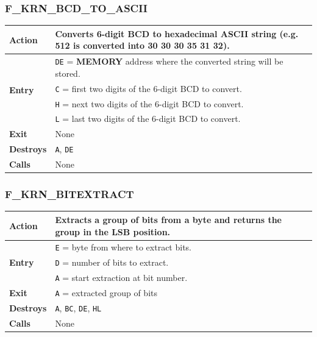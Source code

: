 \documentclass[a4paper,11pt]{article}
\begin{document}
        \subsubsection{F\_KRN\_BCD\_TO\_ASCII}
        \label{func:fkrnbcdtoascii}
        \begin{tabular}{l p{9cm}}
            \hline\textbf{Action}
            & Converts 6-digit BCD to hexadecimal ASCII string
            (e.g. 512 is converted into 30 30 30 35 31 32).\\
            \hline\multirow[t]{4}{4em}{\textbf{Entry}}
            & \texttt{DE} = \textbf{MEMORY} address where the converted string
            will be stored.\\
            & \texttt{C} = first two digits of the 6-digit BCD to convert.\\
            & \texttt{H} = next two digits of the 6-digit BCD to convert.\\
            & \texttt{L} = last two digits of the 6-digit BCD to convert.\\
            \hline\textbf{Exit} & None\\
            \hline\textbf{Destroys} & \texttt{A}, \texttt{DE}\\
            \hline\textbf{Calls} & None\\
            \hline
        \end{tabular}

        \subsubsection{F\_KRN\_BITEXTRACT}
        \label{func:fkrnbitextract}
        \begin{tabular}{l p{9cm}}
            \hline\textbf{Action}
            & Extracts a group of bits from a byte and returns the group in the
            LSB position.\\
            \hline\multirow[t]{3}{4em}{\textbf{Entry}}
            & \texttt{E} = byte from where to extract bits.\\
            & \texttt{D} = number of bits to extract.\\
            & \texttt{A} = start extraction at bit number.\\
            \hline\textbf{Exit} & \texttt{A} = extracted group of bits\\
            \hline\textbf{Destroys} & \texttt{A}, \texttt{BC}, \texttt{DE}, 
            \texttt{HL}\\
            \hline\textbf{Calls} & None\\
            \hline
        \end{tabular}
\end{document}
